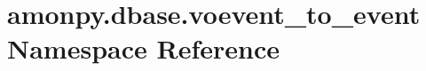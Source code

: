 \hypertarget{namespaceamonpy_1_1dbase_1_1voevent__to__event}{\section{amonpy.\-dbase.\-voevent\-\_\-to\-\_\-event Namespace Reference}
\label{namespaceamonpy_1_1dbase_1_1voevent__to__event}
}
